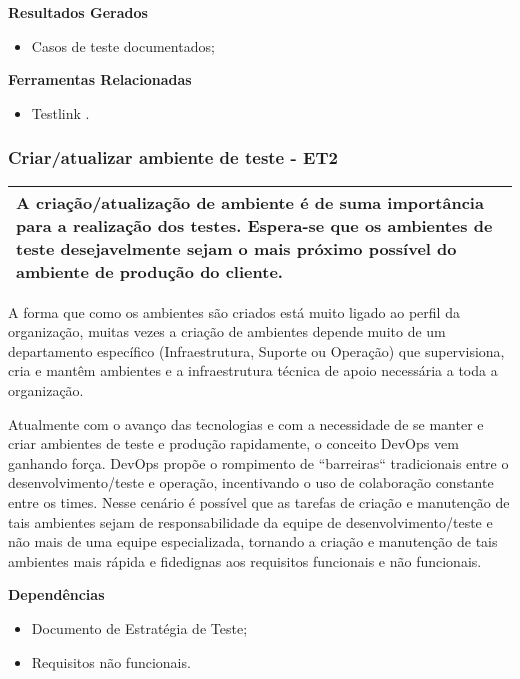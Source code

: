 \textbf{Resultados Gerados}
\begin{itemize}
    \item  Casos de teste documentados;
\end{itemize}

\textbf{Ferramentas Relacionadas}
\begin{itemize}
    \item Testlink \cite{TestLink}.
\end{itemize}

\subsubsection{Criar/atualizar ambiente de teste - ET2}
\label{sec:et2}

\begin{table}[!ht]
\centering
\begin{tabular}{|p{130mm}|}
\hline
A criação/atualização de ambiente é de suma importância para a realização dos testes. Espera-se que os ambientes de teste desejavelmente sejam o mais próximo possível do ambiente de produção do cliente. \\ 
\hline
\end{tabular}
\end{table}

A forma que como os ambientes são criados está muito ligado ao perfil da organização, muitas vezes a criação de ambientes depende muito de um departamento específico (Infraestrutura, Suporte ou Operação) que supervisiona, cria e mantêm ambientes e a infraestrutura técnica de apoio necessária a toda a organização.

Atualmente com o avanço das tecnologias e com a necessidade de se manter e criar ambientes de teste e produção rapidamente, o conceito DevOps vem ganhando força. DevOps propõe o rompimento de “barreiras“ tradicionais entre o desenvolvimento/teste e operação, incentivando o uso de colaboração constante entre os times. Nesse cenário é possível que as tarefas de criação e manutenção de tais ambientes sejam de responsabilidade da equipe de desenvolvimento/teste e não mais de uma equipe especializada, tornando a criação e manutenção de tais ambientes mais rápida e fidedignas aos requisitos funcionais e não funcionais.

\textbf{Dependências}
\begin{itemize}
    \item Documento de Estratégia de Teste;
    \item Requisitos não funcionais.
\end{itemize}

